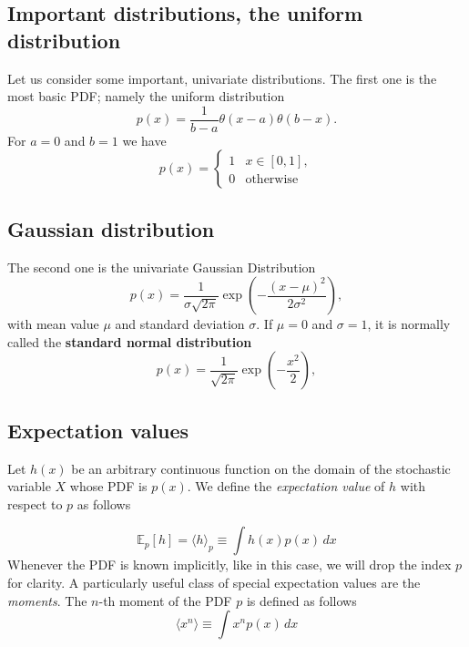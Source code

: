 \documentclass[%
oneside,                 %
final,                   %
10pt]{article}
\newenvironment{block_mdfboxadmon}[1][]{
\begin{block_mdfboxmdframed}[frametitle=#1]
}
{
\end{block_mdfboxmdframed}
}
\begin{document}
\subsection{Important distributions, the uniform distribution}

\begin{block_mdfboxadmon}[]
Let us consider some important, univariate distributions.
The first one
is the most basic PDF; namely the uniform distribution
\begin{equation}
p(x) = \frac{1}{b-a}\theta(x-a)\theta(b-x).
\label{eq:unifromPDF}
\end{equation}
For $a=0$ and $b=1$ we have 
\[
p(x) = \left\{
\begin{array}{ll}
1 & x \in [0,1],\\
0 & \mathrm{otherwise}
\end{array}
\right.
\]
\end{block_mdfboxadmon} %



\subsection{Gaussian distribution}

\begin{block_mdfboxadmon}[]
The second one is the univariate Gaussian Distribution
\begin{equation*}
p(x) = \frac{1}{\sigma\sqrt{2\pi}} \exp{(-\frac{(x-\mu)^2}{2\sigma^2})},
\end{equation*}
with mean value $\mu$ and standard deviation $\sigma$. If $\mu=0$ and $\sigma=1$, it is normally called the \textbf{standard normal distribution}
\begin{equation*}
p(x) = \frac{1}{\sqrt{2\pi}} \exp{(-\frac{x^2}{2})},
\end{equation*}
\end{block_mdfboxadmon} %




\subsection{Expectation values}

\begin{block_mdfboxadmon}[]
Let $h(x)$ be an arbitrary continuous function on the domain of the stochastic
variable $X$ whose PDF is $p(x)$. We define the \emph{expectation value}
of $h$ with respect to $p$ as follows

\begin{equation}
\mathbb{E}_p[h] = \langle h \rangle_p \equiv \int\! h(x)p(x)\,dx
\label{eq:expectation_value_of_h_wrt_p}
\end{equation}
Whenever the PDF is known implicitly, like in this case, we will drop
the index $p$ for clarity.  
A particularly useful class of special expectation values are the
\emph{moments}. The $n$-th moment of the PDF $p$ is defined as
follows
\begin{equation*}
\langle x^n \rangle \equiv \int\! x^n p(x)\,dx
\end{equation*}
\end{block_mdfboxadmon} %
\end{document}
